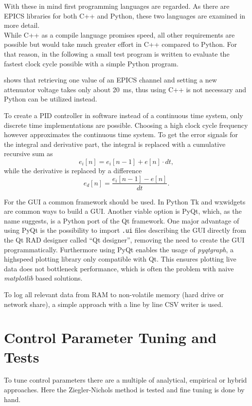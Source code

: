 With these in mind first programming languages are regarded. As there are EPICS libraries for both C++ and Python, these two languages are examined in more detail.\\
While C++ as a compile language promises speed, all other requirements are possible but would take much greater effort in C++ compared to Python. For that reason, in the following a small test program is written to evaluate the fastest clock cycle possible with a simple Python program.

 shows that retrieving one value of an EPICS channel and setting a new attenuator voltage takes only about \SI{20}{\milli\second}, thus using C++ is not necessary and Python can be utilized instead.
 
To create a PID controller in software instead of a continuous time system, only discrete time implementations are possible. Choosing a high clock cycle frequency however approximates the continuous time system. To get the error signals for the integral and derivative part, the integral is replaced with a cumulative recursive sum as
\begin{equation}
e_i[n]=e_i[n-1]+e[n] \cdot dt,
\end{equation}
while the derivative is replaced by a difference
\begin{equation}
e_d[n]=\frac{e_i[n-1]-e[n]}{dt}.
\end{equation}
 
For the GUI a common framework should be used. In Python Tk and wxwidgets are common ways to build a GUI. Another viable option is PyQt, which, as the name suggests, is a Python port of the Qt framework. One major advantage of using PyQt is the possibility to import \texttt{.ui} files describing the GUI directly from the Qt RAD designer called ``Qt designer'', removing the need to create the GUI programmatically. Furthermore using PyQt enables the usage of \textit{pyqtgraph}, a highspeed plotting library only compatible with Qt. This ensures plotting live data does not bottleneck performance, which is often the problem with naive \textit{matplotlib} based solutions.

To log all relevant data from RAM to non-volatile memory (hard drive or network share), a simple approach with a line by line CSV writer is used.


\FloatBarrier
\section{Control Parameter Tuning and Tests}
To tune control parameters there are a multiple of analytical, empirical or hybrid approaches. Here the Ziegler-Nichols method is tested and fine tuning is done by hand.


